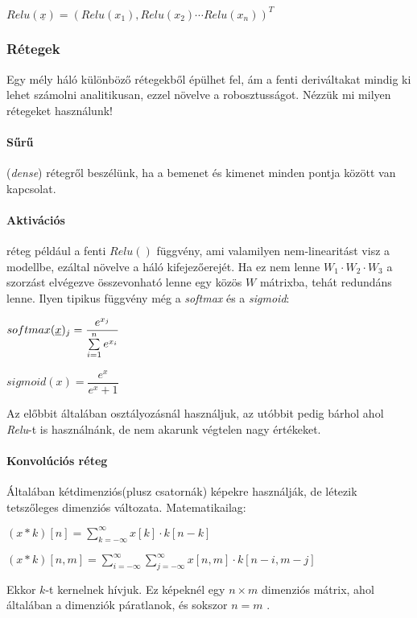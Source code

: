 $ Relu(\underline{x}) = (Relu(x_1), Relu(x_2) \cdots Relu(x_n))^T $



\subsubsection{Rétegek}


Egy mély háló különböző rétegekből épülhet fel, ám a fenti deriváltakat
mindig ki lehet számolni analitikusan, ezzel növelve a robosztusságot.
Nézzük mi milyen rétegeket használunk!

\paragraph{Sűrű} (\textit{dense}) rétegről beszélünk, ha a bemenet és kimenet 
minden pontja között van kapcsolat.

\paragraph{Aktivációs} réteg például a fenti $ Relu() $ függvény, ami 
valamilyen nem-linearitást visz a modellbe, ezáltal növelve a háló 
kifejezőerejét. Ha ez nem lenne $ W_1 \cdot W_2 \cdot W_3 $ a szorzást 
elvégezve összevonható lenne egy közös $ W $ mátrixba, tehát redundáns 
lenne. Ilyen tipikus függvény még a \textit{softmax} és a \textit{sigmoid}:

$ softmax(\underline{x})_j = \dfrac{e^{x_j}}{\sum\limits_{{i}=1}^{n}e^{x_i}} $


$ sigmoid(x) = \dfrac{e^x}{e^x + 1} $

\noindent
Az előbbit általában osztályozásnál használjuk, az utóbbit pedig 
bárhol ahol \textit{Relu}-t is használnánk, de nem akarunk végtelen 
nagy értékeket.



\paragraph{Konvolúciós réteg} Általában kétdimenziós(plusz csatornák) 
képekre használják, de létezik tetszőleges dimenziós változata. 
Matematikailag:


$ (x*k)[n] =  \sum\limits_{k=-\infty}^{\infty} x[k] \cdot k[n-k] $

$ (x*k)[n, m] =  
\sum\limits_{i=-\infty}^{\infty} 
\sum\limits_{j=-\infty}^{\infty} 
x[n, m] \cdot k[n-i, m-j] $

\noindent
Ekkor $ k $-t kernelnek hívjuk.
Ez képeknél egy $ n \times m $ dimenziós mátrix, 
ahol általában a dimenziók páratlanok, és sokszor $ n = m $ .


